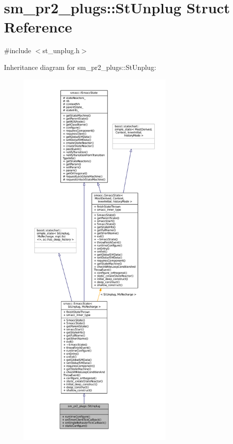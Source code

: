 \hypertarget{structsm__pr2__plugs_1_1StUnplug}{}\section{sm\+\_\+pr2\+\_\+plugs\+:\+:St\+Unplug Struct Reference}
\label{structsm__pr2__plugs_1_1StUnplug}


{\ttfamily \#include $<$st\+\_\+unplug.\+h$>$}



Inheritance diagram for sm\+\_\+pr2\+\_\+plugs\+:\+:St\+Unplug\+:
\nopagebreak
\begin{figure}[H]
\begin{center}
\leavevmode
\includegraphics[height=550pt]{structsm__pr2__plugs_1_1StUnplug__inherit__graph}
\end{center}
\end{figure}



